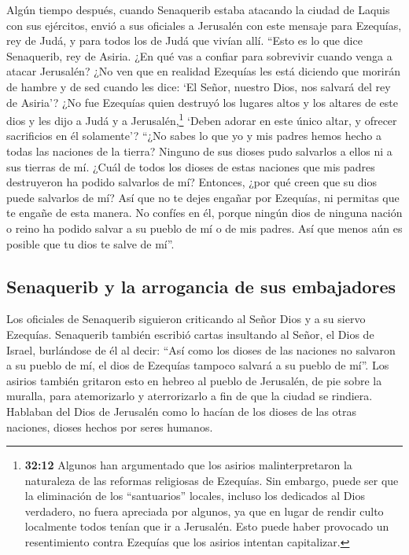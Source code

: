  Algún tiempo después, cuando Senaquerib estaba atacando
la ciudad de Laquis con sus ejércitos, envió a sus oficiales a Jerusalén
con este mensaje para Ezequías, rey de Judá, y para todos los de Judá
que vivían allí.  ``Esto es lo que dice Senaquerib, rey
de Asiria. ¿En qué vas a confiar para sobrevivir cuando venga a atacar
Jerusalén?  ¿No ven que en realidad Ezequías les está
diciendo que morirán de hambre y de sed cuando les dice: `El Señor,
nuestro Dios, nos salvará del rey de Asiria'?  ¿No fue
Ezequías quien destruyó los lugares altos y los altares de este dios y
les dijo a Judá y a Jerusalén,\footnote{\textbf{32:12} Algunos han
  argumentado que los asirios malinterpretaron la naturaleza de las
  reformas religiosas de Ezequías. Sin embargo, puede ser que la
  eliminación de los ``santuarios'' locales, incluso los dedicados al
  Dios verdadero, no fuera apreciada por algunos, ya que en lugar de
  rendir culto localmente todos tenían que ir a Jerusalén. Esto puede
  haber provocado un resentimiento contra Ezequías que los asirios
  intentan capitalizar.} `Deben adorar en este único altar, y ofrecer
sacrificios en él solamente'?  ``¿No sabes lo que yo y
mis padres hemos hecho a todas las naciones de la tierra? Ninguno de sus
dioses pudo salvarlos a ellos ni a sus tierras de mí. 
¿Cuál de todos los dioses de estas naciones que mis padres destruyeron
ha podido salvarlos de mí? Entonces, ¿por qué creen que su dios puede
salvarlos de mí?  Así que no te dejes engañar por
Ezequías, ni permitas que te engañe de esta manera. No confíes en él,
porque ningún dios de ninguna nación o reino ha podido salvar a su
pueblo de mí o de mis padres. Así que menos aún es posible que tu dios
te salve de mí''.

\hypertarget{senaquerib-y-la-arrogancia-de-sus-embajadores}{%
\subsection{Senaquerib y la arrogancia de sus
embajadores}\label{senaquerib-y-la-arrogancia-de-sus-embajadores}}

 Los oficiales de Senaquerib siguieron criticando al
Señor Dios y a su siervo Ezequías.  Senaquerib también
escribió cartas insultando al Señor, el Dios de Israel, burlándose de él
al decir: ``Así como los dioses de las naciones no salvaron a su pueblo
de mí, el dios de Ezequías tampoco salvará a su pueblo de mí''.
 Los asirios también gritaron esto en hebreo al pueblo de
Jerusalén, de pie sobre la muralla, para atemorizarlo y aterrorizarlo a
fin de que la ciudad se rindiera.  Hablaban del Dios de
Jerusalén como lo hacían de los dioses de las otras naciones, dioses
hechos por seres humanos.

